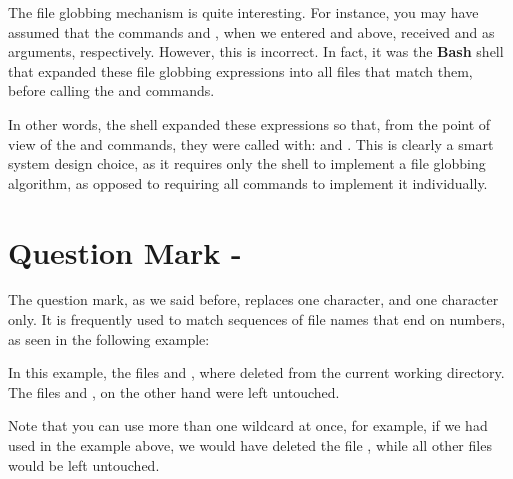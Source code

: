 \begin{my_box}
The file globbing mechanism is quite interesting. For instance, you may have assumed that the commands  and , when we entered  and  above, received  and  as arguments, respectively. However, this is incorrect. In fact, it was the \textbf{Bash} shell that expanded these file globbing expressions into all files that match them, before calling the  and  commands.

In other words, the shell expanded these expressions so that, from the point of view of the  and  commands, they were called with:  and . This is clearly a smart system design choice, as it requires only the shell to implement a file globbing algorithm, as opposed to requiring all commands to implement it individually.
\end{my_box}

\section{Question Mark - }

The question mark, as we said before, replaces one character, and one character only. It is frequently used to match sequences of file names that end on numbers, as seen in the following example:
In this example, the files  and , where deleted from the current working directory. The files  and , on the other hand were left untouched.

Note that you can use more than one wildcard at once, for example, if we had used  in the example above, we would have deleted the file , while all other files would be left untouched.

